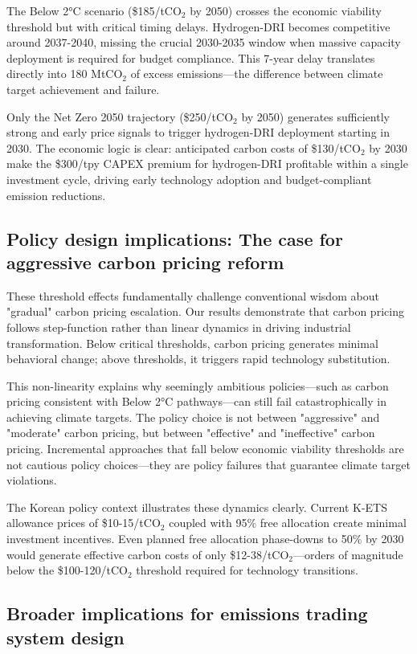 \documentclass[preprint,5p,authoryear]{elsarticle}
\begin{document}
The Below 2°C scenario (\$185/tCO$_2$ by 2050) crosses the economic viability threshold but with critical timing delays. Hydrogen-DRI becomes competitive around 2037-2040, missing the crucial 2030-2035 window when massive capacity deployment is required for budget compliance. This 7-year delay translates directly into 180 MtCO$_2$ of excess emissions—the difference between climate target achievement and failure.

Only the Net Zero 2050 trajectory (\$250/tCO$_2$ by 2050) generates sufficiently strong and early price signals to trigger hydrogen-DRI deployment starting in 2030. The economic logic is clear: anticipated carbon costs of \$130/tCO$_2$ by 2030 make the \$300/tpy CAPEX premium for hydrogen-DRI profitable within a single investment cycle, driving early technology adoption and budget-compliant emission reductions.

\subsection{Policy design implications: The case for aggressive carbon pricing reform}

These threshold effects fundamentally challenge conventional wisdom about "gradual" carbon pricing escalation. Our results demonstrate that carbon pricing follows step-function rather than linear dynamics in driving industrial transformation. Below critical thresholds, carbon pricing generates minimal behavioral change; above thresholds, it triggers rapid technology substitution.

This non-linearity explains why seemingly ambitious policies—such as carbon pricing consistent with Below 2°C pathways—can still fail catastrophically in achieving climate targets. The policy choice is not between "aggressive" and "moderate" carbon pricing, but between "effective" and "ineffective" carbon pricing. Incremental approaches that fall below economic viability thresholds are not cautious policy choices—they are policy failures that guarantee climate target violations.

The Korean policy context illustrates these dynamics clearly. Current K-ETS allowance prices of \$10-15/tCO$_2$ coupled with 95\% free allocation create minimal investment incentives. Even planned free allocation phase-downs to 50\% by 2030 would generate effective carbon costs of only \$12-38/tCO$_2$—orders of magnitude below the \$100-120/tCO$_2$ threshold required for technology transitions.

\subsection{Broader implications for emissions trading system design}
\end{document}
